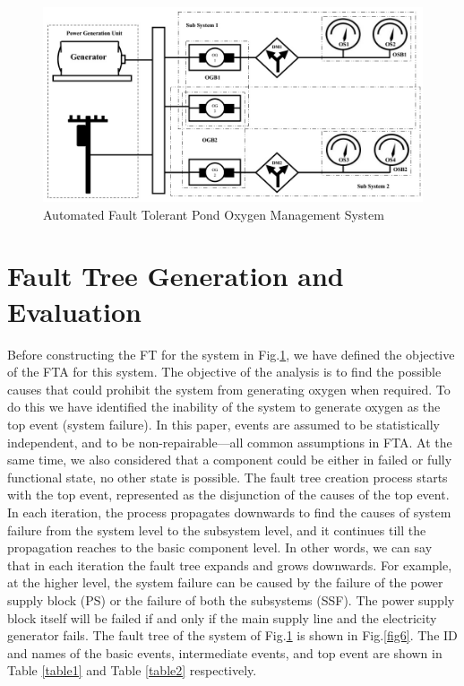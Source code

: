 \documentclass[10pt]{llncs}
\begin{document}
\begin{figure}[thpb]
      \centering
   
			\includegraphics[scale=0.45]{pond_system1}
 	 
      \caption{Automated Fault Tolerant Pond Oxygen Management System}
      \label{fig5}
   \end{figure}	
	


	
\section{ Fault Tree Generation and Evaluation}
\label{sec:4}
Before constructing the FT for the system in Fig.\ref{fig5}, we have defined the objective of the FTA for this system. The objective of the analysis is to find the possible causes that could prohibit the system from generating oxygen when required. To do this we have identified the inability of the system to generate oxygen as the top event  (system failure). In this paper, events are assumed to be statistically independent, and to be non-repairable---all common assumptions in FTA. At the same time, we also considered that a component could be either in failed or fully functional state, no other state is possible. The fault tree creation process starts with the top event, represented as the disjunction of the causes of the top event. In each iteration, the process propagates downwards to find the causes of system failure from the system level to the subsystem level, and it continues till the propagation reaches to the basic component level. In other words, we can say that in each iteration the fault tree expands and grows downwards. For example, at the higher level, the system failure can be caused by the failure of the power supply block (PS) or the failure of both the subsystems (SSF). The power supply block itself will be failed if and only if the main supply line and the electricity generator fails. The fault tree of the system of Fig.\ref{fig5} is shown in Fig.\ref{fig6}.  The ID and names of the basic events, intermediate events, and top event are shown in Table \ref{table1} and Table \ref{table2} respectively. 
\end{document}
